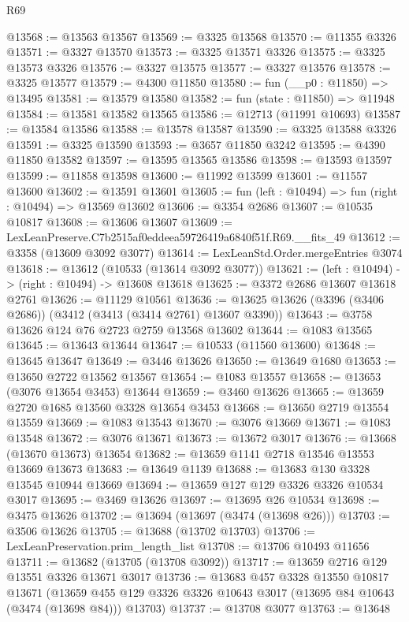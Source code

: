 \begin{lexlean}{R69}
\begin{coremodule}
@13568 := @13563 @13567
@13569 := @3325 @13568
@13570 := @11355 @3326
@13571 := @3327 @13570
@13573 := @3325 @13571 @3326
@13575 := @3325 @13573 @3326
@13576 := @3327 @13575
@13577 := @3327 @13576
@13578 := @3325 @13577
@13579 := @4300 @11850
@13580 := fun (__p0 : @11850) => @13495
@13581 := @13579 @13580
@13582 := fun (state : @11850) => @11948
@13584 := @13581 @13582 @13565
@13586 := @12713 (@11991 @10693)
@13587 := @13584 @13586
@13588 := @13578 @13587
@13590 := @3325 @13588 @3326
@13591 := @3325 @13590
@13593 := @3657 @11850 @3242
@13595 := @4390 @11850 @13582
@13597 := @13595 @13565 @13586
@13598 := @13593 @13597
@13599 := @11858 @13598
@13600 := @11992 @13599
@13601 := @11557 @13600
@13602 := @13591 @13601
@13605 := fun (left : @10494) => fun (right : @10494) => @13569 @13602
@13606 := @3354 @2686
@13607 := @10535 @10817
@13608 := @13606 @13607
@13609 := LexLeanPreserve.C7b2515af0eddeea59726419a6840f51f.R69.__fits_49
@13612 := @3358 (@13609 @3092 @3077)
@13614 := LexLeanStd.Order.mergeEntries @3074
@13618 := @13612 (@10533 (@13614 @3092 @3077))
@13621 := (left : @10494) -> (right : @10494) -> @13608 @13618
@13625 := @3372 @2686 @13607 @13618 @2761
@13626 := @11129 @10561
@13636 := @13625 @13626 (@3396 (@3406 @2686)) (@3412 (@3413 (@3414 @2761) @13607 @3390))
@13643 := @3758 @13626 @124 @76 @2723 @2759 @13568 @13602
@13644 := @1083 @13565
@13645 := @13643 @13644
@13647 := @10533 (@11560 @13600)
@13648 := @13645 @13647
@13649 := @3446 @13626
@13650 := @13649 @1680
@13653 := @13650 @2722 @13562 @13567
@13654 := @1083 @13557
@13658 := @13653 (@3076 @13654 @3453) @13644
@13659 := @3460 @13626
@13665 := @13659 @2720 @1685 @13560 @3328 @13654 @3453
@13668 := @13650 @2719 @13554 @13559
@13669 := @1083 @13543
@13670 := @3076 @13669
@13671 := @1083 @13548
@13672 := @3076 @13671
@13673 := @13672 @3017
@13676 := @13668 (@13670 @13673) @13654
@13682 := @13659 @1141 @2718 @13546 @13553 @13669 @13673
@13683 := @13649 @1139
@13688 := @13683 @130 @3328 @13545 @10944 @13669
@13694 := @13659 @127 @129 @3326 @3326 @10534 @3017
@13695 := @3469 @13626
@13697 := @13695 @26 @10534
@13698 := @3475 @13626
@13702 := @13694 (@13697 (@3474 (@13698 @26)))
@13703 := @3506 @13626
@13705 := @13688 (@13702 @13703)
@13706 := LexLeanPreservation.prim_length_list
@13708 := @13706 @10493 @11656
@13711 := @13682 (@13705 (@13708 @3092))
@13717 := @13659 @2716 @129 @13551 @3326 @13671 @3017
@13736 := @13683
    @457
    @3328
    @13550
    @10817
    @13671
    (@13659 @455 @129 @3326 @3326 @10643 @3017 (@13695 @84 @10643 (@3474 (@13698 @84))) @13703)
@13737 := @13708 @3077
@13763 := @13648

\end{coremodule}
\end{lexlean}

